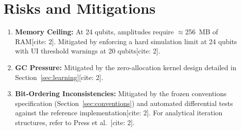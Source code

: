 \documentclass[conference]{IEEEtran}
\begin{document}
\section{Risks and Mitigations}
\begin{enumerate}
    \item \textbf{Memory Ceiling:} At 24 qubits, amplitudes require $\approx$256~MB of RAM[cite: 2]. Mitigated by enforcing a hard simulation limit at 24 qubits with UI threshold warnings at 20 qubits[cite: 2].
    \item \textbf{GC Pressure:} Mitigated by the zero-allocation kernel design detailed in Section~\ref{sec:learning}[cite: 2].
    \item \textbf{Bit-Ordering Inconsistencies:} Mitigated by the frozen conventions specification (Section~\ref{sec:conventions}) and automated differential tests against the reference implementation[cite: 2]. For analytical iteration structures, refer to Press et al.~\cite{recipes}[cite: 2].
\end{enumerate}
\end{document}

